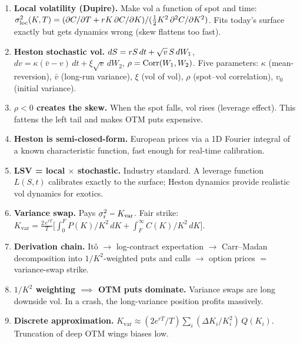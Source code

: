 \begin{keyfactbox}
\begin{enumerate}
  \item \textbf{Local volatility (Dupire).}
    Make vol a function of spot and time:
    $\sigma_{\text{loc}}^2(K,T)
    = (\partial C/\partial T + rK\,\partial C/\partial K)
    / (\tfrac12 K^2\,\partial^2 C/\partial K^2)$.
    Fits today's surface exactly but gets dynamics wrong (skew flattens
    too fast).

  \item \textbf{Heston stochastic vol.}
    $dS = rS\,dt + \sqrt{v}\,S\,dW_1$,\;
    $dv = \kappa(\bar v - v)\,dt + \xi\sqrt{v}\,dW_2$,\;
    $\rho = \operatorname{Corr}(W_1,W_2)$.
    Five parameters: $\kappa$ (mean-reversion), $\bar v$ (long-run
    variance), $\xi$ (vol of vol), $\rho$ (spot--vol correlation),
    $v_0$ (initial variance).

  \item \textbf{$\rho < 0$ creates the skew.}
    When the spot falls, vol rises (leverage effect).  This fattens
    the left tail and makes OTM puts expensive.

  \item \textbf{Heston is semi-closed-form.}
    European prices via a 1D Fourier integral of a known
    characteristic function, fast enough for real-time calibration.

  \item \textbf{LSV = local $\times$ stochastic.}
    Industry standard.  A leverage function $L(S,t)$ calibrates
    exactly to the surface; Heston dynamics provide realistic vol
    dynamics for exotics.

  \item \textbf{Variance swap.}
    Pays $\sigma_{\text{r}}^2 - K_{\text{var}}$.  Fair strike:
    $K_{\text{var}} = \tfrac{2\,e^{rT}}{T}
    \bigl[\int_0^F P(K)/K^2\,dK + \int_F^\infty C(K)/K^2\,dK\bigr]$.

  \item \textbf{Derivation chain.}
    It\^o $\to$ log-contract expectation $\to$ Carr--Madan
    decomposition into $1/K^2$-weighted puts and calls $\to$ option
    prices $=$ variance-swap strike.

  \item \textbf{$1/K^2$ weighting $\implies$ OTM puts dominate.}
    Variance swaps are long downside vol.  In a crash, the
    long-variance position profits massively.

  \item \textbf{Discrete approximation.}
    $K_{\text{var}} \approx (2e^{rT}/T)\sum_i
    (\Delta K_i / K_i^2)\,Q(K_i)$.  Truncation of deep OTM wings
    biases low.


\end{enumerate}
\end{keyfactbox}
